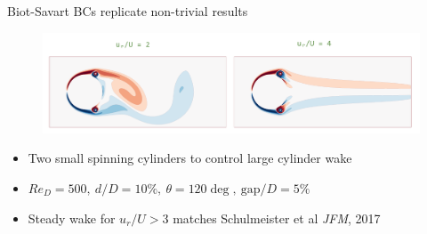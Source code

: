 \documentclass[aspectratio=169,small]{beamer}
\makeatletter
\newcommand{\mininomen}[2][1]{{\let\thefootnote\relax%
	\footnotetext{\begin{tabular}{*{#1}{@{\!}>{\centering\arraybackslash}p{1em}@{\;}p{\textwidth/#1-2em}}}%
	#2\end{tabular}}}}
\makeatother
\begin{document}
\begin{frame}[fragile]{Biot-Savart BCs replicate non-trivial results} %
    \begin{figure}
        \centering
        \includegraphics[width=\textwidth]{fig/spinning cylinders.png}
    \end{figure}
    \begin{itemize}
        \item Two small spinning cylinders to control large cylinder wake
        \item $Re_D=500,\ d/D=10\%,\ \theta=120\deg,\ \text{gap}/D=5\%$
        \item Steady wake for $u_r/U>3$ matches Schulmeister et al \textit{JFM}, 2017
    \end{itemize}
\end{frame}

	
	
	
	



\end{document}
